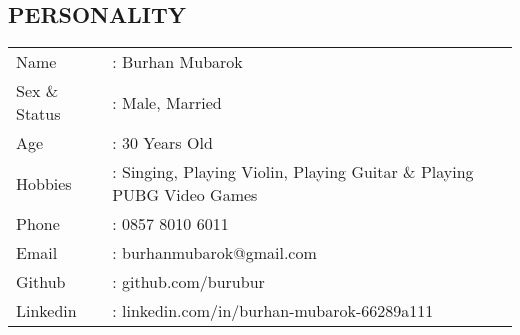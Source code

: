 \documentclass[11pt,a4paper,english]{article}
\begin{document}
\subsection*{PERSONALITY}
\begin{tabular}{ll}
	Name &: Burhan Mubarok\\
	Sex \& Status &: Male, Married\\
	Age &: 30 Years Old\\
	Hobbies &: Singing, Playing Violin, Playing Guitar \& Playing PUBG Video Games\\
	Phone &: 0857 8010 6011\\
	Email &: burhanmubarok@gmail.com\\
	Github &: github.com/burubur\\
	Linkedin &: linkedin.com/in/burhan-mubarok-66289a111\\
\end{tabular}
\end{document}
